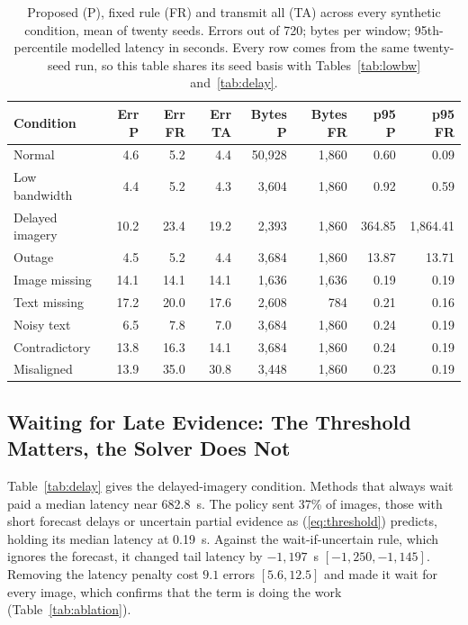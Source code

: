 \documentclass[conference,a4paper]{IEEEtran}
\newif\ifsubmission
\newcommand{\masteronly}[1]{\ifsubmission\else#1\fi}
\newcommand{\mtab}[2]{\ifsubmission#2\else Table~\ref{#1}\fi}
\begin{document}
\masteronly{%
\begin{table}[!t]
\caption{Proposed (P), fixed rule (FR) and transmit all (TA) across every synthetic condition, mean of twenty seeds. Errors out of 720; bytes per window; 95th-percentile modelled latency in seconds. Every row comes from the same twenty-seed run, so this table shares its seed basis with Tables~\ref{tab:lowbw} and~\ref{tab:delay}.}
\label{tab:allcond}
\centering\scriptsize\setlength{\tabcolsep}{1.6pt}
\begin{tabular}{@{}p{1.55cm}rrrrrrr@{}}
\toprule
Condition & Err P & Err FR & Err TA & Bytes P & Bytes FR & p95 P & p95 FR \\
\midrule
Normal & 4.6 & 5.2 & 4.4 & 50,928 & 1,860 & 0.60 & 0.09 \\
Low bandwidth & 4.4 & 5.2 & 4.3 & 3,604 & 1,860 & 0.92 & 0.59 \\
Delayed imagery & 10.2 & 23.4 & 19.2 & 2,393 & 1,860 & 364.85 & 1,864.41 \\
Outage & 4.5 & 5.2 & 4.4 & 3,684 & 1,860 & 13.87 & 13.71 \\
Image missing & 14.1 & 14.1 & 14.1 & 1,636 & 1,636 & 0.19 & 0.19 \\
Text missing & 17.2 & 20.0 & 17.6 & 2,608 & 784 & 0.21 & 0.16 \\
Noisy text & 6.5 & 7.8 & 7.0 & 3,684 & 1,860 & 0.24 & 0.19 \\
Contradictory & 13.8 & 16.3 & 14.1 & 3,684 & 1,860 & 0.24 & 0.19 \\
Misaligned & 13.9 & 35.0 & 30.8 & 3,448 & 1,860 & 0.23 & 0.19 \\
\bottomrule
\end{tabular}
\end{table}}%

\subsection{Waiting for Late Evidence: The Threshold Matters, the Solver Does Not}
\label{sec:delay}
Table~\ref{tab:delay} gives the delayed-imagery condition. Methods that always wait paid a median latency near 682.8~s. The policy sent 37\% of images, those with short forecast delays or uncertain partial evidence as (\ref{eq:threshold}) predicts, holding its median latency at 0.19~s. Against the wait-if-uncertain rule, which ignores the forecast, it changed tail latency by $-1{,}197$~s $[-1{,}250, -1{,}145]$. Removing the latency penalty cost $9.1$ errors $[5.6, 12.5]$ and made it wait for every image, which confirms that the term is doing the work (\mtab{tab:ablation}{every ablation is tabulated in the package}).
\end{document}
